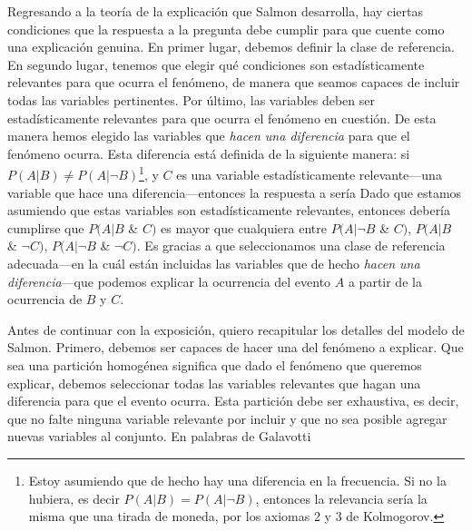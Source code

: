 Regresando a la teoría de la explicación que Salmon
desarrolla, hay ciertas condiciones que la respuesta a la
pregunta  debe cumplir para que
cuente como una explicación genuina. En primer lugar,
debemos definir la clase de referencia. En segundo lugar,
tenemos que elegir qué condiciones son estadísticamente
relevantes para que ocurra el fenómeno, de manera que seamos
capaces de incluir todas las variables pertinentes. Por último, las
variables deben ser estadísticamente relevantes para que
ocurra el
fenómeno en cuestión. De esta manera hemos elegido las
variables que \emph{hacen una diferencia} para que el
fenómeno ocurra. Esta diferencia está definida de la
siguiente manera: si $ P( A | B ) \neq P( A | \neg{ B } )
$\footnote{
  Estoy asumiendo que de hecho hay una diferencia en la
  frecuencia. Si no la hubiera, es decir $ P( A | B ) = P( A
  | \neg{ B } ) $, entonces la relevancia sería la misma que
  una tirada de moneda, por los axiomas 2 y	3 de Kolmogorov.
},
y $C$ es una variable estadísticamente relevante---una
variable que hace una diferencia---entonces la respuesta a
 sería  Dado que estamos asumiendo que estas variables son
estadísticamente relevantes, entonces debería cumplirse que
$ P( A | B$ \& $C )$ es mayor que cualquiera entre $ P( A |
\neg{ B }$ \& $C ) $, $ P( A | B$ \& $\neg{ C } ) $, $ P( A
| \neg{ B }$ \& $\neg{ C } ) $. Es gracias a que
seleccionamos una clase de referencia adecuada---en la cuál
están incluidas las variables que de hecho \emph{hacen una
diferencia}---que podemos explicar la ocurrencia del evento
$ A $ a partir de la ocurrencia de $ B $ y $ C $.

Antes de continuar con la exposición, quiero recapitular
los detalles del modelo de Salmon. Primero, debemos ser
capaces de hacer una  del
fenómeno a explicar. Que sea una partición homogénea
significa que dado el fenómeno que queremos explicar,
debemos seleccionar todas las variables relevantes que
hagan una diferencia para que el evento ocurra. Esta
partición debe ser exhaustiva, es decir, que no falte
ninguna variable relevante por incluir y que no sea
posible agregar nuevas variables al conjunto. En palabras
de Galavotti 

